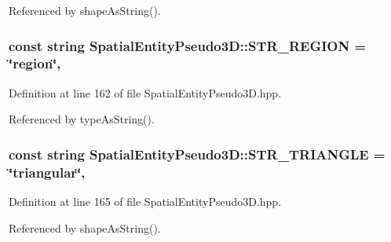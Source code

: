 Referenced by shape\-As\-String().

\hypertarget{classmultiscale_1_1analysis_1_1SpatialEntityPseudo3D_a30d78540776d80a96e8cfe16645cf50a}{
\subsubsection[{S\-T\-R\-\_\-\-R\-E\-G\-I\-O\-N}]{\setlength{\rightskip}{0pt plus 5cm}const string Spatial\-Entity\-Pseudo3\-D\-::\-S\-T\-R\-\_\-\-R\-E\-G\-I\-O\-N = \char`\"{}region\char`\"{}\hspace{0.3cm}{\ttfamily [static]}, {\ttfamily [protected]}}}\label{classmultiscale_1_1analysis_1_1SpatialEntityPseudo3D_a30d78540776d80a96e8cfe16645cf50a}


Definition at line 162 of file Spatial\-Entity\-Pseudo3\-D.\-hpp.



Referenced by type\-As\-String().

\hypertarget{classmultiscale_1_1analysis_1_1SpatialEntityPseudo3D_a8ad67f0073da808ad1badedf2e613ed3}{
\subsubsection[{S\-T\-R\-\_\-\-T\-R\-I\-A\-N\-G\-L\-E}]{\setlength{\rightskip}{0pt plus 5cm}const string Spatial\-Entity\-Pseudo3\-D\-::\-S\-T\-R\-\_\-\-T\-R\-I\-A\-N\-G\-L\-E = \char`\"{}triangular\char`\"{}\hspace{0.3cm}{\ttfamily [static]}, {\ttfamily [protected]}}}\label{classmultiscale_1_1analysis_1_1SpatialEntityPseudo3D_a8ad67f0073da808ad1badedf2e613ed3}


Definition at line 165 of file Spatial\-Entity\-Pseudo3\-D.\-hpp.



Referenced by shape\-As\-String().

